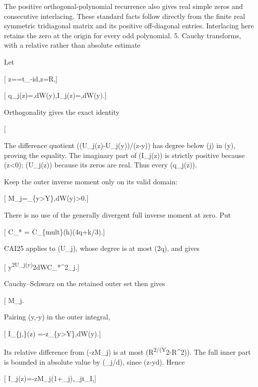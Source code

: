 The positive orthogonal-polynomial recurrence also gives real simple zeros and consecutive interlacing. These standard facts follow directly from the finite real symmetric tridiagonal matrix and its positive off-diagonal entries. Interlacing here retains the zero at the origin for every odd polynomial. 5. Cauchy transforms, with a relative rather than absolute estimate

Let

{[} z==t\_\lambda-id,\qquad \textbar z\textbar=R,{]}

{[} q\_j(z)=\int{},dW(y),\qquad I\_j(z)=\int{},dW(y).{]}

Orthogonality gives the exact identity

{[}  \tag{EC20}{]}

The difference quotient ((U\_j(z)-U\_j(y))/(z-y)) has degree below (j) in (y), proving the equality. The imaginary part of (I\_j(z)) is strictly positive because (z\textless0); (U\_j(z)) because its zeros are real. Thus every (q\_j(z)).

Keep the outer inverse moment only on its valid domain:

{[} M\_j=\int\_\{\textbar y\textbar\textgreater Y\},dW(y)\textgreater0.{]}

There is no use of the generally divergent full inverse moment at zero. Put

{[} C\_* = C\_\{\rm mult\}(h)(4q+\lfloor k/3\rfloor).{]}

CAI25 applies to (\widehat\chi U\_j), whose degree is at most (2q), and gives

{[} \int y\textsuperscript{2U\_j(y)}2dW\le C\_*\^{}2\nu\_j.{]}

Cauchy--Schwarz on the retained outer set then gives

{[} M\_j\ge{}. \tag{EC21}{]}

Pairing (y,-y) in the outer integral,

{[} I\_\{j,\}(z) =-z\int\_\{\textbar y\textbar\textgreater Y\},dW(y).{]}

Its relative difference from (-zM\_j) is at most (R\textsuperscript{2/(Y}2-R\^{}2)). The full inner part is bounded in absolute value by (\eta\nu\_j/d), since (\textbar z-y\textbar{}\ge d). Hence

{[} I\_j(z)=-zM\_j(1+\epsilon\_j),\qquad \textbar{}\epsilon\_j\textbar{}\le t\_I,{]}


